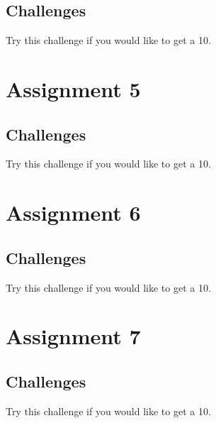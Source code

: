 \documentclass[a4paper,12pt]{article}
\begin{document}
\clearpage
\subsection{Challenges}
Try this challenge  if you would like to get a 10.


\section{Assignment 5}





\clearpage
\subsection{Challenges}
Try this challenge  if you would like to get a 10.



\section{Assignment 6}




\clearpage
\subsection{Challenges}
Try this challenge  if you would like to get a 10.


\section{Assignment 7}





\clearpage
\subsection{Challenges}
Try this challenge  if you would like to get a 10.




% 
% 
\end{document}
